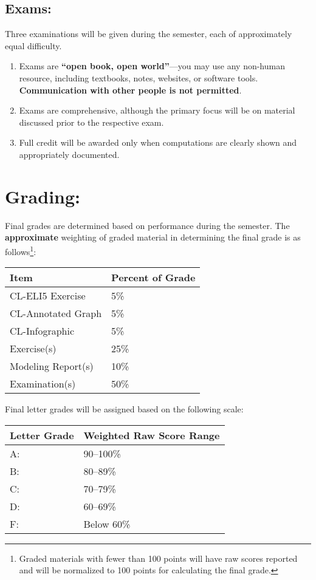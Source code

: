 \documentclass[12pt]{article}
\begin{document}
\subsection*{Exams:}
Three examinations will be given during the semester, each of approximately equal difficulty.
\begin{enumerate}
    \item Exams are \textbf{“open book, open world”}—you may use any non-human resource, including textbooks, notes, websites, or software tools. \textbf{Communication with other people is not permitted}.
    \item Exams are comprehensive, although the primary focus will be on material discussed prior to the respective exam.
    \item Full credit will be awarded only when computations are clearly shown and appropriately documented.
\end{enumerate}

\clearpage
\section*{Grading:} Final grades are determined based on performance during the semester.  The \textbf{approximate} weighting of graded material in determining the final grade is as follows\footnote{Graded materials with fewer than 100 points will have raw scores reported and will be normalized to 100 points for calculating the final grade.}:
\begin{table}[h!]
   \centering
   \begin{tabular}{l l}
Item & Percent of Grade \\
\hline
\hline
CL-ELI5 Exercise & 5\% \\
CL-Annotated Graph & 5\% \\
CL-Infographic & 5\% \\
Exercise(s) & 25\% \\
Modeling Report(s) & 10\% \\
Examination(s) & 50\% \\
\hline
\end{tabular}
\end{table}

Final letter grades will be assigned based on the following scale:

\begin{table}[h!]
   \centering
   \begin{tabular}{l l}
Letter Grade & Weighted Raw Score Range \\
\hline
\hline
A:& 90--100\%\\
B:& 80--89\%\\
C:& 70--79\%\\
D:& 60--69\%\\
F:& Below 60\%\\
\hline
\end{tabular}
\end{table}
\end{document}
